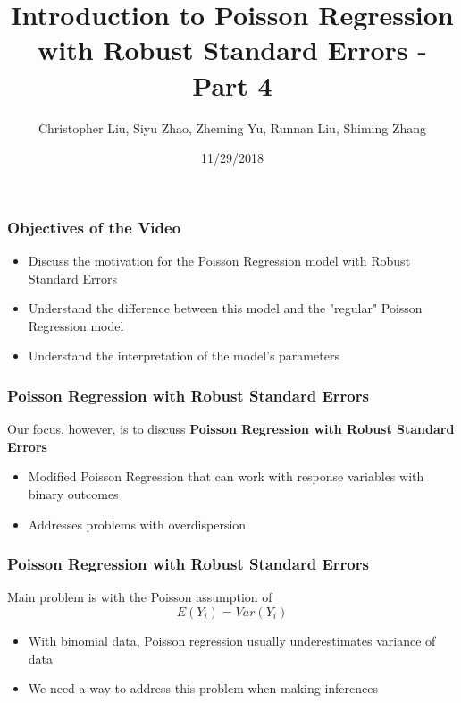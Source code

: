 \documentclass{beamer}
\title{Introduction to Poisson Regression with Robust Standard Errors - Part 4}
\author{Christopher Liu, Siyu Zhao, Zheming Yu, Runnan Liu, Shiming Zhang}
\institute{San Diego State University, Stats 610}
\date{11/29/2018}
\begin{document}
	
	
\begin{frame}[fragile]\frametitle{Objectives of the Video}

	\begin{itemize}
	
		\item Discuss the motivation for the Poisson Regression model with Robust Standard Errors
			
		\item Understand the difference between this model and the "regular" Poisson Regression model		
				
		\item Understand the interpretation of the model's parameters
	
	\end{itemize}	

\end{frame}



\begin{frame}[fragile]\frametitle{Poisson Regression with Robust Standard Errors}
	
	Our focus, however, is to discuss \textbf{Poisson Regression with Robust Standard Errors}

	\begin{itemize}
	
		\item Modified Poisson Regression that can work with response variables with binary outcomes
		
		\item Addresses problems with overdispersion

	\end{itemize}
	
\end{frame}



\begin{frame}[fragile]\frametitle{Poisson Regression with Robust Standard Errors}

	Main problem is with the Poisson assumption of 	
	$$ E(Y_i) = Var(Y_i) $$ 

	\begin{itemize}

		\item With binomial data, Poisson regression usually underestimates variance of data
		
		\item We need a way to address this problem when making inferences

	\end{itemize}
	
\end{frame}
\end{document}
